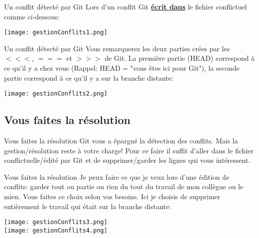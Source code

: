\documentclass{beamer}
\begin{document}
\begin{frame}[fragile]{Un conflit détecté par Git}
Lors d'un conflit Git \textbf{\underline{écrit dans}} le fichier conflictuel comme ci-dessous:
\smallskip
\begin{center}
	\texttt{[image: gestionConflits1.png]}
\end{center}
\end{frame}

\begin{frame}[fragile]{Un conflit détecté par Git}
Vous remarquerez les deux parties crées par les $<<<$, $===$ et $>>>$ de Git. La première partie (HEAD) correspond à ce qu'il y a chez vous (Rappel: HEAD = "vous êtes ici pour Git"), la seconde partie correspond à ce qu'il y a sur la branche distante:
\smallskip
\begin{center}
	\texttt{[image: gestionConflits2.png]}
\end{center}
\end{frame}


\subsection{Vous faites la résolution}
\begin{frame}{Vous faites la résolution}
Git vous a épargné la détection des conflits. Mais la gestion/résolution reste à votre charge! Pour ce faire il suffit d'aller dans le fichier conflictuelle/édité par Git et de supprimer/garder les lignes qui vous intéressent.
\end{frame}

\begin{frame}{Vous faites la résolution}
Je peux faire ce que je veux lors d'une édition de conflits: garder tout ou partie ou rien du tout du travail de mon collègue ou le mien. Vous faites ce choix selon vos besoins. Ici je choisis de supprimer entièrement le travail qui était sur la branche distante:\\
\smallskip

\begin{center}
	\texttt{[image: gestionConflits3.png]}\\
	\vspace{0.5cm}
	\texttt{[image: gestionConflits4.png]}
\end{center}
\end{frame}
\end{document}
